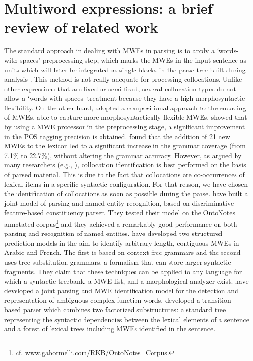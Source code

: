 \documentclass[output=paper]{langsci/langscibook}
\begin{document}
\section{Multiword expressions: a brief review of related work}
\label{sec2}
The standard approach in dealing with MWEs in parsing is to apply a `words-with-spaces' preprocessing step, which marks the MWEs in the input sentence as units which will later be integrated as single blocks in the parse tree built during analysis \citep{brun:1998,zhang06}. This method is not really adequate for processing collocations. Unlike other expressions that are fixed or semi-fixed, several collocation types do not allow a `words-with-spaces' treatment because they have a high morphosyntactic flexibility.
On the other hand, \cite{alegria04,villavicencio07} adopted a compositional approach to the encoding of MWEs, able to capture more morphosyntactically flexible MWEs. \cite{alegria04} showed that by using a MWE processor in the preprocessing stage, a significant improvement in the POS tagging precision is obtained. \cite{villavicencio07} found that the addition of 21 new MWEs to the lexicon led to a significant increase in the grammar coverage (from 7.1\% to 22.7\%), without altering the grammar accuracy.
However, as argued by many researchers (e.g., ), collocation identification is best performed on the basis of parsed material. This is due to the fact that collocations are co-occurrences of lexical items in a specific syntactic configuration. For that reason, we have chosen the identification of collocations as soon as possible during the parse. 
\cite{finkeljr09} have built a joint model of parsing and named entity recognition, based on discriminative feature-based constituency parser. They tested their model on the OntoNotes annotated corpus\footnote{cf. \url{www.gabormelli.com/RKB/OntoNotes_Corpus}.} and they achieved a remarkably good performance on both parsing and recognition of named entities. \cite{greenetal13} have developed two structured prediction models in the aim to identify arbitrary-length, contiguous MWEs in Arabic and French. The first is based on context-free grammars and the second uses tree substitution grammars, a formalism that can store larger syntactic fragments. They claim that these techniques can be applied to any language for which a syntactic treebank, a MWE list, and a morphological analyzer exist. \cite{nasretal15} have developed a joint parsing and MWE identification model for the detection and representation of ambiguous complex function words. \cite{constantnivre16} developed a transition-based parser which combines two factorized substructures: a standard tree representing the syntactic dependencies between the lexical elements of a sentence and a forest of lexical trees including MWEs identified in the sentence. 
\end{document}
